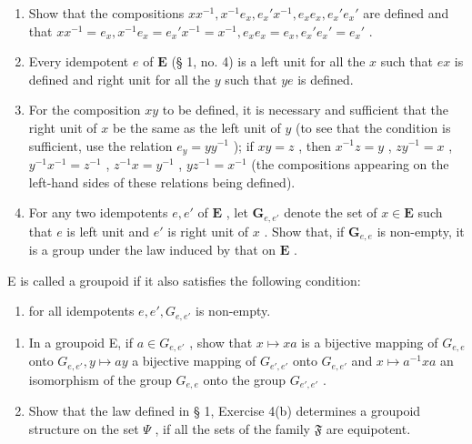 \begin{enumerate}
\def\labelenumi{(\alph{enumi})}
\item
  Show that the compositions \(xx^{-1}, x^{-1}e_x, e_x'x^{-1}, e_x e_x, e_x' e_x'\) are defined and that \(xx^{-1} = e_x, x^{-1}e_x = e_x'x^{-1} = x^{-1}, e_x e_x = e_x, e_x' e_x' = e_x'\) .
\item
  Every idempotent \(e\) of \(\mathbf{E}\) (§ 1, no. 4) is a left unit for all the \(x\) such that \(ex\) is defined and right unit for all the \(y\) such that \(ye\) is defined.
\item
  For the composition \(xy\) to be defined, it is necessary and sufficient that the right unit of \(x\) be the same as the left unit of \(y\) (to see that the condition is sufficient, use the relation \(e_y = yy^{-1}\) ); if \(xy = z\) , then \(x^{-1}z = y\) , \(zy^{-1} = x\) , \(y^{-1}x^{-1} = z^{-1}\) , \(z^{-1}x = y^{-1}\) , \(yz^{-1} = x^{-1}\) (the compositions appearing on the left-hand sides of these relations being defined).
\item
  For any two idempotents \(e, e'\) of \(\mathbf{E}\) , let \(\mathbf{G}_{e, e'}\) denote the set of \(x \in \mathbf{E}\) such that \(e\) is left unit and \(e'\) is right unit of \(x\) . Show that, if \(\mathbf{G}_{e, e}\) is non-empty, it is a group under the law induced by that on \(\mathbf{E}\) .
\end{enumerate}

E is called a groupoid if it also satisfies the following condition:

\begin{enumerate}
\def\labelenumi{(\arabic{enumi})}
\setcounter{enumi}{3}
\tightlist
\item
  for all idempotents \(e, e', G_{e, e'}\) is non-empty.
\end{enumerate}

\begin{enumerate}
\def\labelenumi{(\alph{enumi})}
\setcounter{enumi}{4}
\item
  In a groupoid E, if \(a \in G_{e,e'}\) , show that \(x \mapsto xa\) is a bijective mapping of \(G_{e,e}\) onto \(G_{e,e'}, y \mapsto ay\) a bijective mapping of \(G_{e',e'}\) onto \(G_{e,e'}\) and \(x \mapsto a^{-1}xa\) an isomorphism of the group \(G_{e,e}\) onto the group \(G_{e',e'}\) .
\item
  Show that the law defined in § 1, Exercise 4(b) determines a groupoid structure on the set \(\Psi\) , if all the sets of the family \(\mathfrak{F}\) are equipotent.
\end{enumerate}

